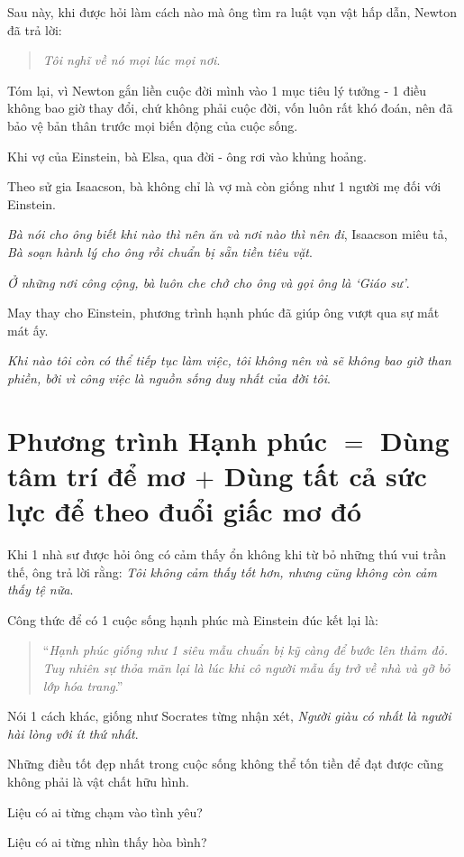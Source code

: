 \documentclass{book}
\numberwithin{equation}{section}
\begin{document}
%
Sau này, khi được hỏi làm cách nào mà ông tìm ra luật vạn vật hấp dẫn, Newton đã trả lời:
\begin{quotation}
    \textit{Tôi nghĩ về nó mọi lúc mọi nơi}.
\end{quotation}
Tóm lại, vì Newton gắn liền cuộc đời mình vào 1 mục tiêu lý tưởng - 1 điều không bao giờ thay đổi, chứ không phải cuộc đời, vốn luôn rất khó đoán, nên đã bảo vệ bản thân trước mọi biến động của cuộc sống.

%
Khi vợ của Einstein, bà Elsa, qua đời - ông rơi vào khủng hoảng.

Theo sử gia Isaacson, bà không chỉ là vợ mà còn giống như 1 người mẹ đối với Einstein.

%
\textit{Bà nói cho ông biết khi nào thì nên ăn và nơi nào thì nên đi}, Isaacson miêu tả, \textit{Bà soạn hành lý cho ông rồi chuẩn bị sẵn tiền tiêu vặt}.

\textit{Ở những nơi công cộng, bà luôn che chở cho ông và gọi ông là `Giáo sư'}.

%
May thay cho Einstein, phương trình hạnh phúc đã giúp ông vượt qua sự mất mát ấy.

\textit{Khi nào tôi còn có thể tiếp tục làm việc, tôi không nên và sẽ không bao giờ than phiền, bởi vì công việc là nguồn sống duy nhất của đời tôi}.

\section{Phương trình Hạnh phúc $=$ Dùng tâm trí để mơ $+$ Dùng tất cả sức lực để theo đuổi giấc mơ đó}
Khi 1 nhà sư được hỏi ông có cảm thấy ổn không khi từ bỏ những thú vui trần thế, ông trả lời rằng: \textit{Tôi không cảm thấy tốt hơn, nhưng cũng không còn cảm thấy tệ nữa}.

%
Công thức để có 1 cuộc sống hạnh phúc mà Einstein đúc kết lại là:
\begin{quotation}
    ``\textit{Hạnh phúc giống như 1 siêu mẫu chuẩn bị kỹ càng để  bước lên thảm đỏ. Tuy nhiên sự thỏa mãn lại là lúc khi cô người mẫu ấy trở về nhà và gỡ bỏ lớp hóa trang}.''
\end{quotation}
Nói 1 cách khác, giống như Socrates từng nhận xét, \textit{Người giàu có nhất là người hài lòng với ít thứ nhất}.

%
Những điều tốt đẹp nhất trong cuộc sống không thể tốn tiền để đạt được cũng  không phải là vật chất hữu hình.

Liệu có ai từng chạm vào tình yêu?

Liệu có ai từng nhìn thấy hòa bình?
\end{document}

